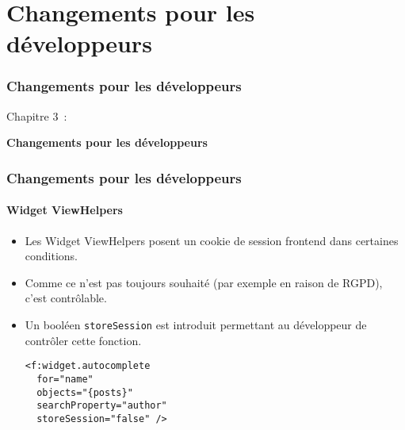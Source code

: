 %

\section{Changements pour les développeurs}
\begin{frame}[fragile]
	\frametitle{Changements pour les développeurs}

	\begin{center}\huge{Chapitre 3~:}\end{center}
	\begin{center}\huge{\color{typo3darkgrey}\textbf{Changements pour les développeurs}}\end{center}

\end{frame}


\begin{frame}[fragile]
	\frametitle{Changements pour les développeurs}
	\framesubtitle{Widget ViewHelpers}

	\lstset{basicstyle=\smaller\ttfamily}

	\begin{itemize}
		\item Les Widget ViewHelpers posent un cookie de session frontend dans certaines conditions.
		\item Comme ce n'est pas toujours souhaité (par exemple en raison de RGPD), c'est contrôlable.
		\item Un booléen \texttt{storeSession} est introduit permettant au développeur de contrôler cette fonction.
\begin{lstlisting}
<f:widget.autocomplete
  for="name"
  objects="{posts}"
  searchProperty="author"
  storeSession="false" />
\end{lstlisting}

	\end{itemize}

\end{frame}

